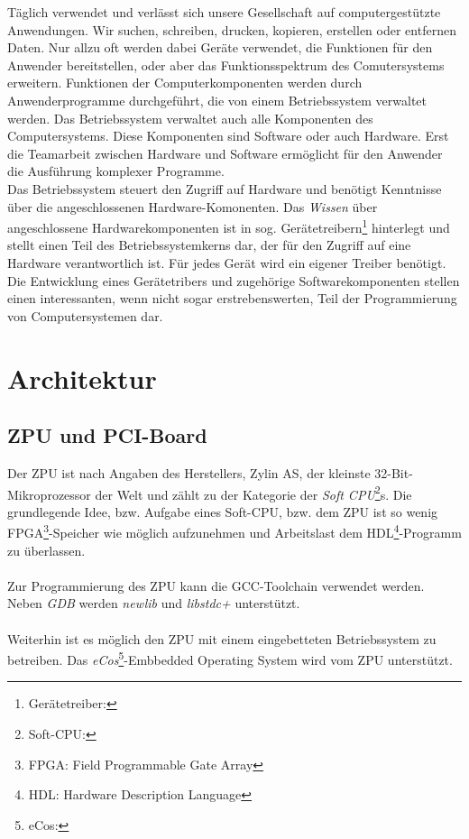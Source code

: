 \documentclass[12pt]{scrartcl}
\begin{document}
Täglich verwendet und verlässt sich unsere Gesellschaft auf computergestützte Anwendungen. Wir suchen, schreiben, drucken, kopieren, erstellen oder entfernen Daten. Nur allzu oft werden dabei Geräte verwendet, die Funktionen für den Anwender bereitstellen, oder aber das Funktionsspektrum des Comutersystems erweitern. Funktionen der Computerkomponenten werden durch Anwenderprogramme durchgeführt, die von einem Betriebssystem verwaltet werden. Das Betriebssystem verwaltet auch alle Komponenten des Computersystems. Diese Komponenten sind Software oder auch Hardware. Erst die Teamarbeit zwischen Hardware und Software ermöglicht für den Anwender die Ausführung komplexer Programme. \\
Das Betriebssystem steuert den Zugriff auf Hardware und benötigt Kenntnisse über die angeschlossenen Hardware-Komonenten. Das \textit{Wissen} über angeschlossene Hardwarekomponenten ist in sog. Gerätetreibern\footnote{Gerätetreiber:} hinterlegt und stellt einen Teil des Betriebssystemkerns dar, der für den Zugriff auf eine Hardware verantwortlich ist. Für jedes Gerät wird ein eigener Treiber benötigt.%
Die Entwicklung eines Gerätetribers und zugehörige Softwarekomponenten stellen einen interessanten, wenn nicht sogar erstrebenswerten, Teil der Programmierung von Computersystemen dar. \\

\pagebreak

\section{Architektur}
 
\subsection{ZPU und PCI-Board}
Der ZPU ist nach Angaben des Herstellers, Zylin AS, der kleinste 32-Bit-Mikroprozessor der Welt und zählt zu der Kategorie der \textit{Soft CPU}\footnote{Soft-CPU:}s. Die grundlegende Idee, bzw. Aufgabe eines Soft-CPU, bzw. dem ZPU ist so wenig FPGA\footnote{FPGA: Field Programmable Gate Array}-Speicher wie möglich aufzunehmen und Arbeitslast dem HDL\footnote{HDL: Hardware Description Language}-Programm zu überlassen. \\
\\
Zur Programmierung des ZPU kann die GCC-Toolchain verwendet werden. Neben \textit{GDB} werden \textit{newlib} und \textit{libstdc+} unterstützt. \\
\\
Weiterhin ist es möglich den ZPU mit einem eingebetteten Betriebssystem zu betreiben. Das \textit{eCos}\footnote{eCos:}-Embbedded Operating System wird vom ZPU unterstützt. 
\end{document}
